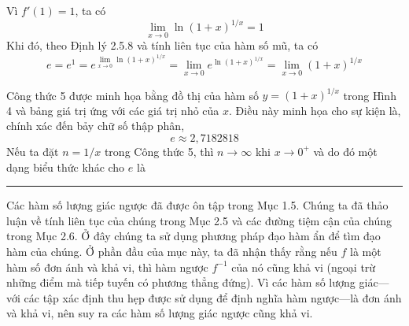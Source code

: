 \begin{minipage}[t]{0.69\textwidth}
  \vspace{0pt}
  Vì $f'(1) = 1$, ta có
  \[
    \lim_{x \to 0} \ln(1 + x)^{1/x} = 1
  \]
  Khi đó, theo Định lý 2.5.8 và tính liên tục của hàm số mũ, ta có
  \[
    e = e^1 = e^{\lim_{x \to 0} \ln(1 + x)^{1/x}} = \lim_{x \to 0} e^{\ln(1 + x)^{1/x}} = \lim_{x \to 0} (1 + x)^{1/x}
  \]

  \vspace{2pt}
  \noindent
  \hfill
  \hfill\null

  \vspace{5pt}
  Công thức 5 được minh họa bằng đồ thị của hàm số $y = (1 + x)^{1/x}$ trong Hình 4 và bảng giá trị ứng với các giá trị nhỏ của $x$. Điều này minh họa cho sự kiện là, chính xác đến bảy chữ số thập phân,
  \[
    e \approx 2{,}7182818
  \]
  Nếu ta đặt $n = 1/x$ trong Công thức 5, thì $n \to \infty$ khi $x \to 0^+$ và do đó một dạng biểu thức khác cho $e$ là

  \vspace{2pt}
  \noindent
  \hfill
  \hfill\null

  \vspace{12pt}
  \noindent
  {\color{stewartcyan}\rule{1.1ex}{1.1ex}}\par

  \vspace{3pt}
  Các hàm số lượng giác ngược đã được ôn tập trong Mục 1.5. Chúng ta đã thảo luận về tính liên tục của chúng trong Mục 2.5 và các đường tiệm cận của chúng trong Mục 2.6. Ở đây chúng ta sử dụng phương pháp đạo hàm ẩn để tìm đạo hàm của chúng. Ở phần đầu của mục này, ta đã nhận thấy rằng nếu $f$ là một hàm số đơn ánh và khả vi, thì hàm ngược $f^{-1}$ của nó cũng khả vi (ngoại trừ những điểm mà tiếp tuyến có phương thẳng đứng). Vì các hàm số lượng giác---với các tập xác định thu hẹp được sử dụng để định nghĩa hàm ngược---là đơn ánh và khả vi, nên suy ra các hàm số lượng giác ngược cũng khả vi.


\end{minipage}
